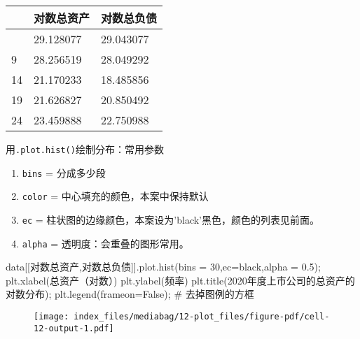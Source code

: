 \documentclass[
  letterpaper,
  DIV=11,
  numbers=noendperiod]{scrreprt}
\newenvironment{Shaded}{\begin{snugshade}}{\end{snugshade}}
\newcommand{\CommentTok}[1]{\textcolor[rgb]{0.37,0.37,0.37}{#1}}
\newcommand{\DecValTok}[1]{\textcolor[rgb]{0.68,0.00,0.00}{#1}}
\newcommand{\FloatTok}[1]{\textcolor[rgb]{0.68,0.00,0.00}{#1}}
\newcommand{\NormalTok}[1]{\textcolor[rgb]{0.00,0.23,0.31}{#1}}
\newcommand{\OperatorTok}[1]{\textcolor[rgb]{0.37,0.37,0.37}{#1}}
\newcommand{\StringTok}[1]{\textcolor[rgb]{0.13,0.47,0.30}{#1}}
\newcommand{\VariableTok}[1]{\textcolor[rgb]{0.07,0.07,0.07}{#1}}
\providecommand{\tightlist}{%
  \setlength{\itemsep}{0pt}\setlength{\parskip}{0pt}}\usepackage{longtable,booktabs,array}
\begin{document}
\begin{longtable}[]{@{}lll@{}}
\toprule\noalign{}
& 对数总资产 & 对数总负债 \\
\midrule\noalign{}
\endhead
\bottomrule\noalign{}
\endlastfoot
4 & 29.128077 & 29.043077 \\
9 & 28.256519 & 28.049292 \\
14 & 21.170233 & 18.485856 \\
19 & 21.626827 & 20.850492 \\
24 & 23.459888 & 22.750988 \\
\end{longtable}

用\texttt{.plot.hist()}绘制分布：常用参数

\begin{enumerate}
\def\labelenumi{\arabic{enumi}.}
\tightlist
\item
  \texttt{bins} = 分成多少段
\item
  \texttt{color} = 中心填充的颜色，本案中保持默认
\item
  \texttt{ec} =
  柱状图的边缘颜色，本案设为'black'黑色，颜色的列表见前面。
\item
  \texttt{alpha} = 透明度：会重叠的图形常用。
\end{enumerate}

\begin{Shaded}
\begin{Highlighting}[]
\NormalTok{data[[}\StringTok{\textquotesingle{}对数总资产\textquotesingle{}}\NormalTok{,}\StringTok{\textquotesingle{}对数总负债\textquotesingle{}}\NormalTok{]].plot.hist(bins }\OperatorTok{=} \DecValTok{30}\NormalTok{,ec}\OperatorTok{=}\StringTok{\textquotesingle{}black\textquotesingle{}}\NormalTok{,alpha }\OperatorTok{=} \FloatTok{0.5}\NormalTok{)}\OperatorTok{;}
\NormalTok{plt.xlabel(}\StringTok{\textquotesingle{}总资产（对数）\textquotesingle{}}\NormalTok{)}
\NormalTok{plt.ylabel(}\StringTok{\textquotesingle{}频率\textquotesingle{}}\NormalTok{)}
\NormalTok{plt.title(}\StringTok{\textquotesingle{}2020年度上市公司的总资产的对数分布\textquotesingle{}}\NormalTok{)}\OperatorTok{;}
\NormalTok{plt.legend(frameon}\OperatorTok{=}\VariableTok{False}\NormalTok{)}\OperatorTok{;} \CommentTok{\# 去掉图例的方框}
\end{Highlighting}
\end{Shaded}

\begin{figure}[H]

{\centering \texttt{[image: index\_files/mediabag/12-plot\_files/figure-pdf/cell-12-output-1.pdf]}

}

\end{figure}
\end{document}
